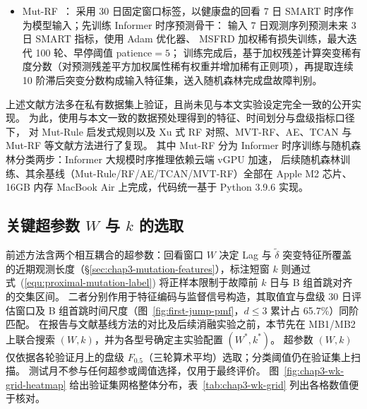 \begin{itemize}[noitemsep, topsep=4pt, parsep=0pt]
    \item Mut-RF~\cite{zhang2024msfrd}：
        采用 30 日固定窗口标签，以健康盘的回看 7 日 SMART 时序作为模型输入；先训练 Informer 时序预测骨干：
        输入 7 日观测序列预测未来 3 日 SMART 指标，使用 Adam 优化器、 MSFRD 加权稀有损失训练，最大迭代 100 轮、早停阈值 patience\(=5\)；
        训练完成后，基于加权残差计算突变稀有度分数（对预测残差平方加权属性稀有权重并增加稀有正则项），再提取连续 10 阶滞后突变分数构成输入特征集，送入随机森林完成盘故障判别。
\end{itemize}

上述文献方法多在私有数据集上验证，且尚未见与本文实验设定完全一致的公开实现。
为此，使用与本文一致的数据预处理得到的特征、时间划分与盘级指标口径下，
对 Mut-Rule 启发式规则以及 Xu 式 RF 对照、MVT-RF、AE、TCAN 与 Mut-RF 等文献方法进行了复现。
其中 Mut-RF 分为 Informer 时序训练与随机森林分类两步：Informer 大规模时序推理依赖云端 vGPU 加速，
后续随机森林训练、其余基线（Mut-Rule/RF/AE/TCAN/MVT-RF）全部在 Apple M2 芯片、16GB 内存 MacBook Air 上完成，代码统一基于 Python 3.9.6 实现。
\subsection{关键超参数 $W$ 与 $k$ 的选取}
\label{sec:chap3-wk-sensitivity}

前述方法含两个相互耦合的超参数：回看窗口 $W$ 决定 Lag 与 $\tilde{\delta}$ 突变特征所覆盖的近期观测长度（\S\ref{sec:chap3-mutation-features}），标注短窗 $k$ 则通过式~(\ref{equ:proximal-mutation-label}) 将正样本限制于故障前 $k$ 日与 B 组首跳对齐的交集区间。
二者分别作用于特征编码与监督信号构造，其取值宜与盘级 30 日评估窗口及 B 组首跳时间尺度（图~\ref{fig:first-jump-pmf}，$d\le 3$ 累计占 65.7\%）同阶匹配。
在报告与文献基线方法的对比及后续消融实验之前，本节先在 MB1/MB2 上联合搜索 $(W,k)$，并为各型号确定主实验配置 $(W^{\ast},k^{\ast})$。
超参数 $(W,k)$ 仅依据各轮验证月上的盘级 $F_{0.5}$（三轮算术平均）选取；分类阈值仍在验证集上扫描。
测试月不参与任何超参或阈值选择，仅用于最终评价。
图~\ref{fig:chap3-wk-grid-heatmap} 给出验证集网格整体分布，表~\ref{tab:chap3-wk-grid} 列出各格数值便于核对。

